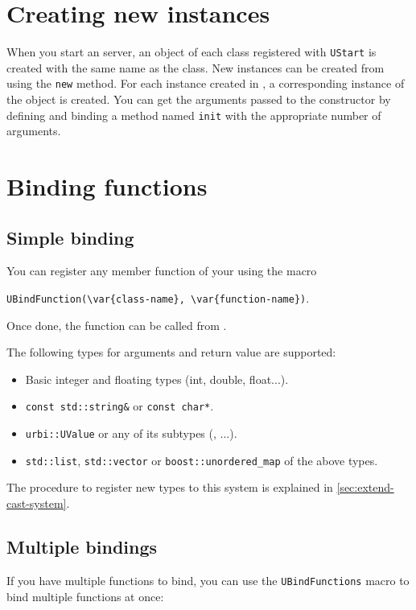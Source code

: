 \section{Creating new instances}

When you start an \urbi server, an object of each class registered
with \lstinline{UStart} is created with the same name as the
class. New instances can be created from \urbi using the
\lstinline|new| method. For each instance created in \urbi, a
corresponding instance of the \Cxx object is created. You can get the
arguments passed to the constructor by defining and binding a method
named \lstinline|init| with the appropriate number of arguments.

\section{Binding functions}

\subsection{Simple binding}

You can register any member function of your \UObject using the macro

\lstinline|UBindFunction(\var{class-name}, \var{function-name})|.

Once done, the function can be called from \us.

The following types for arguments and return value are supported:

\begin{itemize}
\item Basic integer and floating types (int, double, float...).
\item \lstinline{const std::string&} or \lstinline{const char*}.
\item \lstinline{urbi::UValue} or any of its subtypes (\UBinary, \UList...).
\item \lstinline{std::list}, \lstinline{std::vector} or
\lstinline{boost::unordered_map} of the above types.
\end{itemize}

The procedure to register new types to this system is explained in
\autoref{sec:extend-cast-system}.

\subsection{Multiple bindings}
If you have multiple functions to bind, you can use the
\lstinline|UBindFunctions| macro to bind multiple functions at once:

